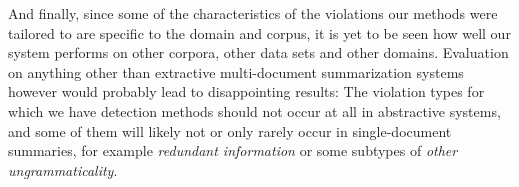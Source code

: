 \documentclass[a4paper,10pt]{scrartcl}
\theoremstyle{style}
\begin{document}
And finally, since some of the characteristics of the violations our methods were tailored to are specific to the domain and corpus, it is yet to be seen how well our system performs on other corpora, other data sets and other domains.
Evaluation on anything other than extractive multi-document summarization systems however would probably lead to disappointing results: The violation types for which we have detection methods should not occur at all in abstractive systems, and some of them will likely not or only rarely occur in single-document summaries, for example \textit{redundant information} or some subtypes of \textit{other ungrammaticality}.

\newpage


\end{document}
